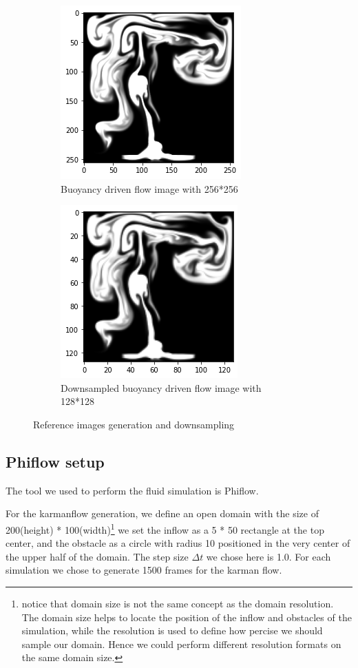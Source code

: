 \documentclass[a4paper,12pt,twoside]{report}
\begin{document}
\begin{figure}
\centering
\begin{subfigure}{0.4\textwidth}
  \centering
  \includegraphics[scale=0.5]{buoyancy_high.png}
  \caption{Buoyancy driven flow image with 256*256}
\end{subfigure}
\begin{subfigure}{0.4\textwidth}
  \centering
  \includegraphics[scale=0.5]{buoyancy_ds.png}
  \caption{Downsampled buoyancy driven flow image with 128*128}
\end{subfigure}
\caption{Reference images generation and downsampling}
\end{figure}
\subsection{Phiflow setup}
The tool we used to perform the fluid simulation is Phiflow\cite{holl2020learning}. 

For the karmanflow generation, we define an open domain with the size of 200(height) * 100(width)\footnote{notice that domain size is not the same concept as the domain resolution. The domain size helps to locate the position of the inflow and obstacles of the simulation, while the resolution is used to define how percise we should sample our domain. Hence we could perform different resolution formats on the same domain size.} we set the inflow as a 5 * 50 rectangle at the top center, and the obstacle as a circle with radius 10 positioned in the very center of the upper half of the domain. The step size $\Delta t$ we chose here is 1.0. For each simulation we chose to generate 1500 frames for the karman flow.
\end{document}
